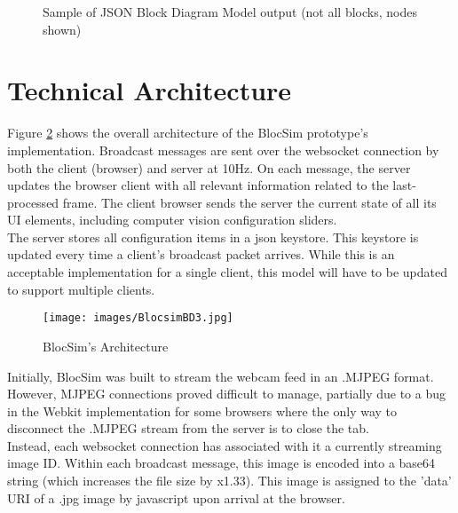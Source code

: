 \begin{figure}[ht!]
	\fontsize{8pt}{8pt}
	\singlespacing
	\begin{mdframed}
	\end{mdframed}
	\caption{Sample of JSON Block Diagram Model output (not all blocks, nodes shown)}
	\label{tab:json}
\end{figure}

\clearpage





\section{Technical Architecture}

Figure \ref{im:BlocsimBD3} shows the overall architecture of the BlocSim prototype's implementation. Broadcast messages are sent over the websocket connection by both the client (browser) and server at 10Hz. On each message, the server updates the browser client with all relevant information related to the last-processed frame. The client browser sends the server the current state of all its UI elements, including computer vision configuration sliders.
\\

The server stores all configuration items in a json keystore. This keystore is updated every time a client's broadcast packet arrives. While this is an acceptable implementation for a single client, this model will have to be updated to support multiple clients.

\begin{figure}[ht!]
\centering
\texttt{[image: images/BlocsimBD3.jpg]}
\caption{BlocSim's Architecture}
\label{im:BlocsimBD3}
\end{figure}

Initially, BlocSim was built to stream the webcam feed in an .MJPEG format. However, MJPEG connections proved difficult to manage, partially due to a bug in the Webkit implementation for some browsers where the only way to disconnect the .MJPEG stream from the server is to close the tab.
\\

Instead, each websocket connection has associated with it a currently streaming image ID. Within each broadcast message, this image is encoded into a base64 string (which increases the file size by x1.33). This image is assigned to the 'data' URI of a .jpg image by javascript upon arrival at the browser.
\\

